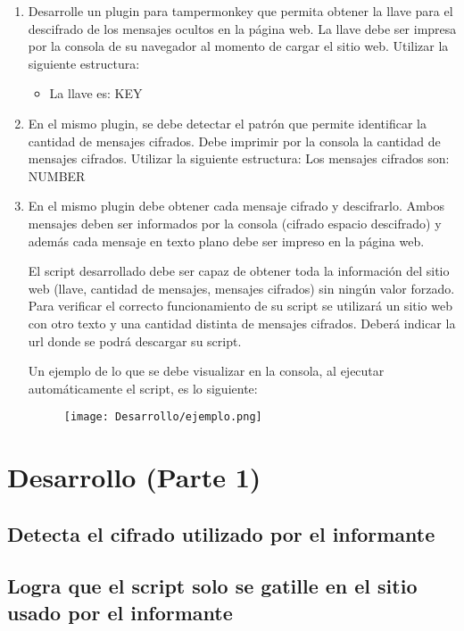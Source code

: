 \documentclass[letter,12pt]{article}
\begin{document}
\begin{enumerate}
    \item Desarrolle un plugin para tampermonkey que permita obtener la llave para el descifrado de los mensajes ocultos en la página web. La llave debe ser impresa por la consola de su navegador al momento de cargar el sitio web. Utilizar la siguiente estructura:
    \begin{itemize}
        \item   La llave es: KEY
    \end{itemize}
    
    \item En el mismo plugin, se debe detectar el patrón que permite identificar la cantidad de mensajes cifrados. Debe imprimir por la consola la cantidad de mensajes cifrados. Utilizar la siguiente estructura:
    Los mensajes cifrados son: NUMBER
    
    \item En el mismo plugin debe obtener cada mensaje cifrado y descifrarlo. Ambos mensajes deben ser informados por la consola (cifrado espacio descifrado) y además cada mensaje en texto plano debe ser impreso en la página web. \par
    El script desarrollado debe ser capaz de obtener toda la información del sitio web (llave, cantidad de mensajes, mensajes cifrados) sin ningún valor forzado. Para verificar el correcto funcionamiento de su script se utilizará un sitio web con otro texto y una cantidad distinta de mensajes cifrados. Deberá indicar la url donde se podrá descargar su script.\par
    Un ejemplo de lo que se debe visualizar en la consola, al ejecutar automáticamente el script, es lo siguiente:

    \begin{figure}[H]
        \centering
        \texttt{[image: Desarrollo/ejemplo.png]}
        \label{fig:ejemplo}
    \end{figure}

\end{enumerate}

\section{Desarrollo (Parte 1)}
\subsection{Detecta el cifrado utilizado por el informante}
\subsection{Logra que el script solo se gatille en el sitio usado por el informante}
\end{document}
